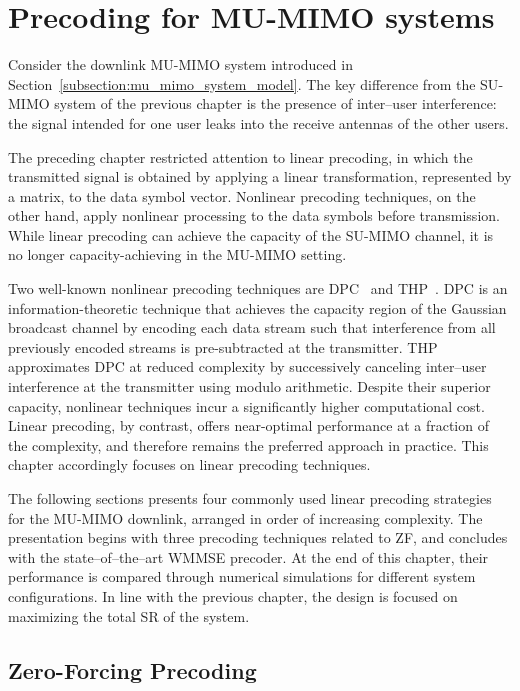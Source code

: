 \chapter{Precoding for MU-MIMO systems}
\label{chapter:mu_mimo_precoding}

Consider the downlink \ac{MU}-\ac{MIMO} system introduced in Section~\ref{subsection:mu_mimo_system_model}.
The key difference from the \ac{SU}-\ac{MIMO} system of the previous chapter is the presence of inter--user interference: the signal intended for one user leaks into the receive antennas of the other users.

The preceding chapter restricted attention to linear precoding, in which the transmitted signal is obtained by applying a linear transformation, represented by a matrix, to the data symbol vector.
Nonlinear precoding techniques, on the other hand, apply nonlinear processing to the data symbols before transmission.
While linear precoding can achieve the capacity of the \ac{SU}-\ac{MIMO} channel, it is no longer capacity-achieving in the \ac{MU}-\ac{MIMO} setting.

Two well-known nonlinear precoding techniques are \acf{DPC}~\cite{dirty_paper_costa} and \acf{THP}~\cite{THP_harashima, THP_MIMO}.
\ac{DPC} is an information-theoretic technique that achieves the capacity region of the Gaussian broadcast channel by encoding each data stream such that interference from all previously encoded streams is pre-subtracted at the transmitter.
\ac{THP} approximates \ac{DPC} at reduced complexity by successively canceling inter--user interference at the transmitter using modulo arithmetic.
Despite their superior capacity, nonlinear techniques incur a significantly higher computational cost.
Linear precoding, by contrast, offers near-optimal performance at a fraction of the complexity, and therefore remains the preferred approach in practice.
This chapter accordingly focuses on linear precoding techniques.

The following sections presents four commonly used linear precoding strategies for the \ac{MU}-\ac{MIMO} downlink, arranged in order of increasing complexity.
The presentation begins with three precoding techniques related to \acs{ZF}, and concludes with the state--of--the--art \acs{WMMSE} precoder.
At the end of this chapter, their performance is compared through numerical simulations for different system configurations.
In line with the previous chapter, the design is focused on maximizing the total \acf{SR} of the system.

\section{Zero-Forcing Precoding}
\label{subsection:mu_mimo_zf_precoding}


